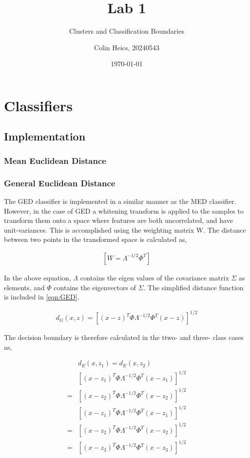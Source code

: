 \documentclass[article, 1.5space, letterpaper, 12pt, oneside, header, footer]{SydeClass}
\title{Lab 1}
\subtitle{Clusters and Classification Boundaries}
\author{Colin Heics, 20240543}
\date{\today}
\begin{document}







\section{Classifiers}

\subsection{Implementation}

\subsubsection{Mean Euclidean Distance}

\subsubsection{General Euclidean Distance}
The GED classifier is implemented in a similar manner as the MED classifier. However, in the case of GED a whitening transform is applied to the samples to transform them onto a space where features are both uncorrelated, and have unit-variances. This is accomplished using the weighting matrix W. The distance between two points in the transformed space is calculated as,


\begin{eqnarray}
\label{eqn:GED-whitening}
\left [ W=\Lambda^{-1/2}\Phi^{T}  \right ]
\end{eqnarray}



In the above equation, $\Lambda$ contains the eigen values of the covariance matrix $\Sigma$ as elements, and $\Phi$ contains the eigenvectors of $\Sigma$. The simplified distance function is included in \ref{eqn:GED}.

\begin{eqnarray}
\label{eqn:GED}
{d}_{G}(x,z) = {\left [ (x-z)^{T}\Phi\Lambda^{-1/2}\Phi^{T}(x-z) \right ]}^{1/2}
\end{eqnarray}


The decision boundary is therefore calculated in the ttwo- and three- class cases as,

\begin{eqnarray}
\label{eqn:boundary-GED}
& d_{E} (x,z_{1}) = d_{E} (x,z_{2}) \\
& \left [ (x-{z}_{1})^{T}\Phi\Lambda^{-1/2}\Phi^{T}(x-z_{1}) \right ]^{1/2} \\
= & \left [ (x-z_{2})^{T}\Phi\Lambda^{-1/2}\Phi^{T}(x-z_{2}) \right ]^{1/2}  \nonumber \\
&\left [ (x-{z}_{1})^{T}\Phi\Lambda^{-1/2}\Phi^{T}(x-z_{1}) \right ]^{1/2} \\
= &\left [ (x-z_{2})^{T}\Phi\Lambda^{-1/2}\Phi^{T}(x-z_{2}) \right ]^{1/2}  \nonumber \\
= &\left [ (x-z_{3})^{T}\Phi\Lambda^{-1/2}\Phi^{T}(x-z_{3}) \right ]^{1/2}  \nonumber
\end{eqnarray}
\end{document}
